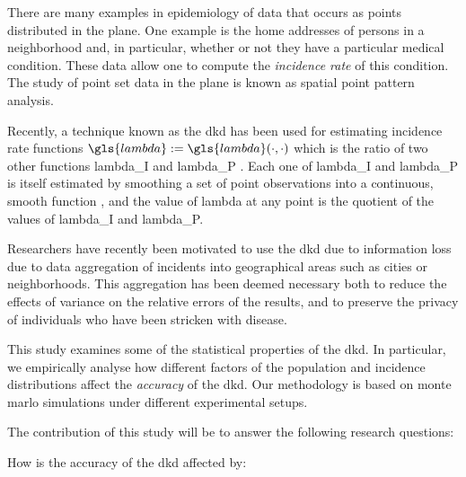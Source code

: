 


There are many examples in epidemiology of data that occurs as points distributed in the plane.
One example is
the home addresses of persons in a neighborhood and,
in particular, whether or not they have a particular medical condition.
These data allow one to compute the \textit{\gls{incidence rate}} of this condition.
The study of point set data in the plane is known as spatial point pattern analysis.

Recently, a technique known as the \gls{dkd} has been used for estimating \gls{incidence rate} functions
$\gls{lambda} := \gls{lambda}\dotdot$
which is the ratio of two other functions \gls{lambda_I} and \gls{lambda_P} \citep{portnov2009studying,kloog2009using,zusman2012residential}.
Each one of \gls{lambda_I} and \gls{lambda_P} is itself estimated by smoothing a set of point observations into a continuous,
smooth function \citep{bithell1990application},
and the value of \gls{lambda} at any point is the quotient of the values of
\gls{lambda_I} and \gls{lambda_P}.

Researchers have recently been motivated to use the \gls{dkd} due to information loss due to data aggregation of incidents into geographical areas such as cities or neighborhoods.
This aggregation has been deemed necessary both
to reduce the effects of variance on the relative errors of the results,
and to preserve the privacy of individuals who have been stricken with disease.

This study examines some of the statistical properties of the \gls{dkd}.
In particular,
we empirically analyse how different factors of the population and incidence distributions
affect the \textit{accuracy} of the \gls{dkd}.
Our methodology is based on monte marlo simulations under different experimental setups.

The contribution of this study will be to answer the following research questions:

\begin{question}
    \label{thm:accuracy-affected}
    How is the accuracy of the \gls{dkd} affected by:
\end{question}

